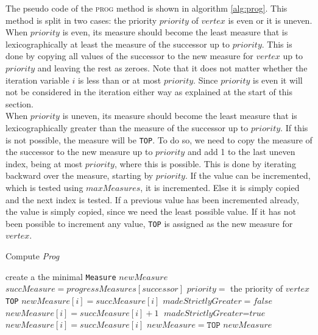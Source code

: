 \documentclass[10pt,a4paper]{article}
\newcommand{\algoname}[1]{\textnormal{\textsc{#1}}}
\begin{document}
The pseudo code of the \algoname{prog} method is shown in algorithm \ref{alg:prog}. This method is split in two cases: the priority $priority$ of $vertex$ is even or it is uneven.\\
When $priority$ is even, its measure should become the least measure that is lexicographically at least the measure of the successor up to $priority$. This is done by copying all values of the successor to the new measure for $vertex$ up to $priority$ and leaving the rest as zeroes. Note that it does not matter whether the iteration variable $i$ is less than or at most $priority$. Since $priority$ is even it will not be considered in the iteration either way as explained at the start of this section.\\
When $priority$ is uneven, its measure should become the least measure that is lexicographically greater than the measure of the successor up to $priority$. If this is not possible, the measure will be \texttt{TOP}. To do so, we need to copy the measure of the successor to the new measure up to $priority$ and add 1 to the last uneven index, being at most $priority$, where this is possible. This is done by iterating backward over the measure, starting by $priority$. If the value can be incremented, which is tested using $maxMeasures$, it is incremented. Else it is simply copied and the next index is tested. If a previous value has been incremented already, the value is simply copied, since we need the least possible value. If it has not been possible to increment any value, \texttt{TOP} is assigned as the new measure for $vertex$.

\begin{algorithm}
\caption{Compute \textit{Prog}}\label{alg:prog}
\begin{algorithmic}[1]
		\State create a the minimal \texttt{Measure} $newMeasure$
		\State $succMeasure = progressMeasures[successor]$
		\State $priority =$ the priority of $vertex$
			\State \Return \texttt{TOP}
		\EndIf
				\State $newMeasure[i] = succMeasure[i]$
			\EndFor
		\Else
			\State $\textit{madeStrictlyGreater} = false$
					\State $newMeasure[i] = succMeasure[i] + 1$
                	\State $\textit{madeStrictlyGreater} = \textit{true}$
                \Else
                	\State $newMeasure[i] = succMeasure[i]$
                \EndIf
            \EndFor
        		\State $newMeasure = \texttt{TOP}$
       		\EndIf
       	\EndIf
       	\State \Return $newMeasure$
	\EndProcedure
\end{algorithmic}
\end{algorithm}
\end{document}
